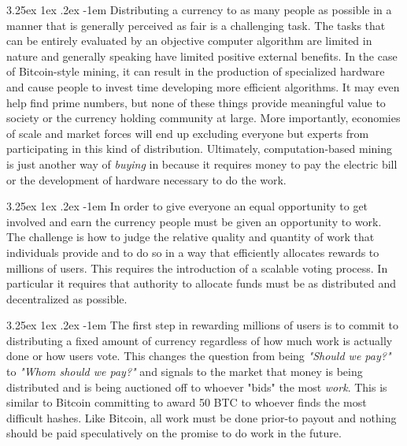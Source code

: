 \documentclass{article}
\makeatletter
\renewcommand\paragraph{\@startsection{paragraph}{5}{\z@}%
  {3.25ex \@plus1ex \@minus.2ex}%
  {-1em}%
  {\normalfont\normalsize\bfseries}}
\makeatother
\begin{document}
                \paragraph{}
                    Distributing a currency to as many people as possible
in a manner that is generally perceived as fair is a challenging task. The
tasks that can be entirely evaluated by an objective computer algorithm are
limited in nature and generally speaking have limited positive external
benefits. In the case of Bitcoin-style mining, it can result in the
production of specialized hardware and cause people to invest time
developing more efficient algorithms. It may even help find prime numbers,
but none of these things provide meaningful value to society or the
currency holding community at large. More importantly, economies of scale
and market forces will end up excluding everyone but experts from
participating in this kind of distribution. Ultimately, computation-based
mining is just another way of \textit{buying} in because it requires money
to pay the electric bill or the development of hardware necessary to do
the work.

                \paragraph{}
                    In order to give everyone an equal opportunity to get
involved and earn the currency people must be given an opportunity to work.
The challenge is how to judge the relative quality and quantity of work
that individuals provide and to do so in a way that efficiently allocates
rewards to millions of users. This requires the introduction of a scalable
voting process. In particular it requires that authority to allocate funds
must be as distributed and decentralized as possible.

                \paragraph{}
                    The first step in rewarding millions of users is to
commit to distributing a fixed amount of currency regardless of how much
work is actually done or how users vote. This changes the question from
being \textit{"Should we pay?"} to \textit{"Whom should we pay?"} and
signals to the market that money is being distributed and is being
auctioned off to whoever "bids" the most \textit{work}. This is similar
to Bitcoin committing to award 50 BTC to whoever finds the most difficult
hashes. Like Bitcoin, all work must be done prior-to payout and nothing
should be paid speculatively on the promise to do work in the future.
\end{document}
